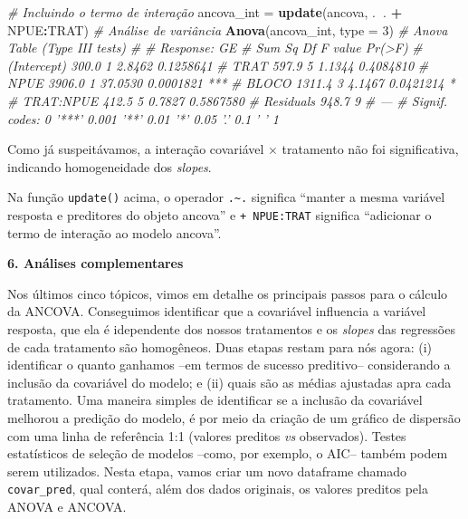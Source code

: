 \documentclass[
]{book}
\newenvironment{Shaded}{\begin{snugshade}}{\end{snugshade}}
\newcommand{\CommentTok}[1]{\textcolor[rgb]{0.56,0.35,0.01}{\textit{#1}}}
\newcommand{\DataTypeTok}[1]{\textcolor[rgb]{0.13,0.29,0.53}{#1}}
\newcommand{\DecValTok}[1]{\textcolor[rgb]{0.00,0.00,0.81}{#1}}
\newcommand{\KeywordTok}[1]{\textcolor[rgb]{0.13,0.29,0.53}{\textbf{#1}}}
\newcommand{\NormalTok}[1]{#1}
\newcommand{\OperatorTok}[1]{\textcolor[rgb]{0.81,0.36,0.00}{\textbf{#1}}}
\newcommand{\StringTok}[1]{\textcolor[rgb]{0.31,0.60,0.02}{#1}}
\begin{document}
\begin{Shaded}
\begin{Highlighting}[]
\CommentTok{# Incluindo o termo de interação}
\NormalTok{ancova_int =}\StringTok{ }\KeywordTok{update}\NormalTok{(ancova, .}\OperatorTok{~}\NormalTok{. }\OperatorTok{+}\StringTok{ }\NormalTok{NPUE}\OperatorTok{:}\NormalTok{TRAT)}
\CommentTok{# Análise de variância}
\KeywordTok{Anova}\NormalTok{(ancova_int, }\DataTypeTok{type =} \DecValTok{3}\NormalTok{) }
\CommentTok{# Anova Table (Type III tests)}
\CommentTok{# }
\CommentTok{# Response: GE}
\CommentTok{#             Sum Sq Df F value    Pr(>F)    }
\CommentTok{# (Intercept)  300.0  1  2.8462 0.1258641    }
\CommentTok{# TRAT         597.9  5  1.1344 0.4084810    }
\CommentTok{# NPUE        3906.0  1 37.0530 0.0001821 ***}
\CommentTok{# BLOCO       1311.4  3  4.1467 0.0421214 *  }
\CommentTok{# TRAT:NPUE    412.5  5  0.7827 0.5867580    }
\CommentTok{# Residuals    948.7  9                      }
\CommentTok{# ---}
\CommentTok{# Signif. codes:  0 '***' 0.001 '**' 0.01 '*' 0.05 '.' 0.1 ' ' 1}
\end{Highlighting}
\end{Shaded}

Como já suspeitávamos, a interação covariável \(\times\) tratamento não foi significativa, indicando homogeneidade dos \emph{slopes}.

\begin{dica}
Na função \texttt{update()} acima, o operador \texttt{.\textasciitilde{}.} significa ``manter a mesma variável resposta e preditores do objeto ancova'' e \texttt{+\ NPUE:TRAT} significa ``adicionar o termo de interação ao modelo ancova''.
\end{dica}

\textbf{6. Análises complementares}

Nos últimos cinco tópicos, vimos em detalhe os principais passos para o cálculo da ANCOVA. Conseguimos identificar que a covariável influencia a variável resposta, que ela é idependente dos nossos tratamentos e os \emph{slopes} das regressões de cada tratamento são homogêneos. Duas etapas restam para nós agora: (i) identificar o quanto ganhamos --em termos de sucesso preditivo-- considerando a inclusão da covariável do modelo; e (ii) quais são as médias ajustadas apra cada tratamento. Uma maneira simples de identificar se a inclusão da covariável melhorou a predição do modelo, é por meio da criação de um gráfico de dispersão com uma linha de referência 1:1 (valores preditos \emph{vs} observados). Testes estatísticos de seleção de modelos --como, por exemplo, o AIC-- também podem serem utilizados. Nesta etapa, vamos criar um novo dataframe chamado \texttt{covar\_pred}, qual conterá, além dos dados originais, os valores preditos pela ANOVA e ANCOVA.
\end{document}
